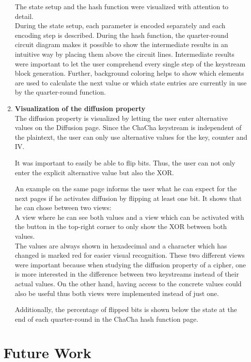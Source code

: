 \begin{enumerate}[label=(\labelenum{G}{{\arabic*}}), wide, labelwidth=!, labelindent=0pt]
     The state setup and the hash function were visualized with attention to detail. \\
     During the state setup, each parameter is encoded separately and each encoding step is described. During the hash function, the quarter-round circuit diagram makes it possible to show the intermediate results in an intuitive way by placing them above the circuit lines. Intermediate results were important to let the user comprehend every single step of the keystream block generation. Further, background coloring helps to show which elements are used to calculate the next value or which state entries are currently in use by the quarter-round function.
     
     \item \textbf{Visualization of the diffusion property}\\
     The diffusion property is visualized by letting the user enter alternative values on the Diffusion page. Since the ChaCha keystream is independent of the plaintext, the user can only use alternative values for the key, counter and IV.
     
     It was important to easily be able to flip bits. Thus, the user can not only enter the explicit alternative value but also the XOR.
     
     An example on the same page informs the user what he can expect for the next pages if he activates diffusion by flipping at least one bit. It shows that he can chose between two views: \\
     A view where he can see both values and a view which can be activated with the button in the top-right corner to only show the XOR between both values.\\
     The values are always shown in hexadecimal and a character which has changed is marked red for easier visual recognition. These two different views were important because when studying the diffusion property of a cipher, one is more interested in the difference between two keystreams instead of their actual values. On the other hand, having access to the concrete values could also be useful thus both views were implemented instead of just one.
     
     Additionally, the percentage of flipped bits is shown below the state at the end of each quarter-round in the ChaCha hash function page.
  \end{enumerate}



\section{Future Work}
\label{sec:futureWork}

